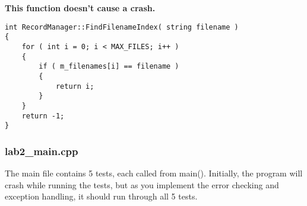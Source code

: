 \documentclass[a4paper,12pt]{book}
\begin{document}
            \textbf{This function doesn't cause a crash.}
            
\begin{lstlisting}[style=code]
int RecordManager::FindFilenameIndex( string filename )
{
    for ( int i = 0; i < MAX_FILES; i++ )
    {
        if ( m_filenames[i] == filename )
        {
            return i;
        }
    }
    return -1;
}
\end{lstlisting}

            \newpage
            \subsubsection*{lab2\_main.cpp}

            The main file contains 5 tests, each called from main().
            Initially, the program will crash while running the tests,
            but as you implement the error checking and exception
            handling, it should run through all 5 tests.
\end{document}
